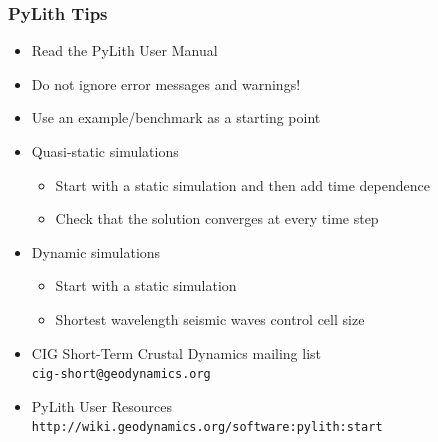 \documentclass{beamer}
\newcommand{\important}[1]{{\color{red}#1}}
\begin{document}
\begin{frame}
  \frametitle{PyLith Tips}
  \summary{}
 
  \begin{itemize}
  \item \important{Read the PyLith User Manual}
  \item \important{Do not ignore error messages and warnings!}
  \item Use an example/benchmark as a starting point
  \item Quasi-static simulations
    \begin{itemize}
    \item Start with a static simulation and then add time dependence
    \item \important{Check that the solution converges at every time step}
    \end{itemize}
  \item Dynamic simulations
    \begin{itemize}
    \item Start with a static simulation
    \item \important{Shortest wavelength seismic waves control cell size}
    \end{itemize}
  \item CIG Short-Term Crustal Dynamics mailing list\\
    {\tt \important{cig-short@geodynamics.org}}
  \item PyLith User Resources\\
    {\small\tt \important{http://wiki.geodynamics.org/software:pylith:start}}
  \end{itemize}

\end{frame}
\end{document}

